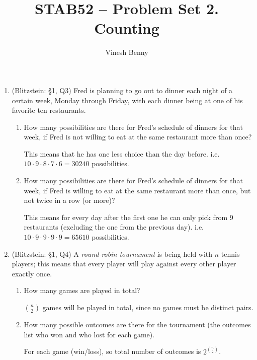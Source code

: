 \documentclass[11pt]{article}
\title{STAB52 -- Problem Set 2. Counting}
\author{Vinesh Benny}
\begin{document}
\begin{enumerate}
	\item (Blitzstein: \S 1, Q3) Fred is planning to go out to dinner each night of a certain week, Monday through Friday, with each dinner being at one of his favorite ten restaurants.
	\begin{enumerate}
		\item How many possibilities are there for Fred’s schedule of dinners for that week, if Fred is not willing to eat at the same restaurant more than once?
			\begin{mdframed}
				This means that he has one less choice than the day before. i.e. $ 10 \cdot 9 \cdot 8 \cdot 7 \cdot 6 = 30240$ possibilities.
			\end{mdframed}
		\item How many possibilities are there for Fred’s schedule of dinners for that week, if Fred is willing to eat at the same restaurant more than once, but not twice in a row (or more)?
			\begin{mdframed}
				This means for every day after the first one he can only pick from 9 restaurants (excluding the one from the previous day). i.e. $ 10 \cdot 9 \cdot 9 \cdot 9 \cdot 9 = 65610$ possibilities.
			\end{mdframed}
	\end{enumerate}

	\item (Blitzstein: \S 1, Q4) A \emph{round-robin tournament} is being held with $ n $ tennis players; this means that every player will play against every other player exactly once.
		\begin{enumerate}
			\item How many games are played in total?
				\begin{mdframed}
					$ \binom{n}{2} $ games will be played in total, since no games must be distinct pairs.
				\end{mdframed}
			\item How many possible outcomes are there for the tournament (the outcomes list who won and who lost for each game).
				\begin{mdframed}
					For each game (win/loss), so total number of outcomes is $ 2^{\binom{n}{2}} $.
				\end{mdframed}
		\end{enumerate}


\end{enumerate}
\end{document}
